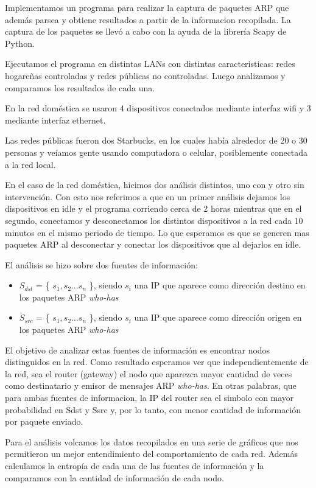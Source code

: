 Implementamos un programa para realizar la captura de paquetes ARP que además parsea y obtiene resultados a partir de la informacion recopilada. La captura de los paquetes se llevó a cabo con la ayuda de la librería Scapy de Python.

Ejecutamos el programa en distintas LANs con distintas caracteristicas: redes hogare\~nas controladas y redes públicas no controladas. Luego analizamos y comparamos los resultados de cada una.\

En la red doméstica se usaron 4 dispositivos conectados mediante interfaz wifi y 3 mediante interfaz ethernet.

Las redes públicas fueron dos Starbucks, en los cuales había alrededor de 20 o 30 personas y veíamos gente usando computadora o celular, posiblemente conectada a la red local.

En el caso de la red doméstica, hicimos dos análisis distintos, uno con y otro sin intervención. Con esto nos referimos a que en un primer análisis dejamos los dispositivos en idle y el programa corriendo cerca de 2 horas mientras
que en el segundo, conectamos y desconectamos los distintos dispositivos a la red cada 10 minutos en el mismo periodo de tiempo. Lo que esperamos es que se generen mas paquetes ARP al desconectar y conectar los dispositivos que al dejarlos en idle.

El análisis se hizo sobre dos fuentes de información:

\begin{itemize}
\item $S_{dst}$ = \{ $s_{1},s_{2} \ldots s_{n} $ \}, siendo $s_{i}$ una IP que aparece como dirección destino en los paquetes
ARP \emph{who-has}
\item $S_{src}$ = \{ $s_{1},s_{2} \ldots s_{n} $ \}, siendo $s_{i}$ una IP que aparece como dirección origen en los paquetes
ARP \emph{who-has}
\end{itemize}

El objetivo de analizar estas fuentes de información es encontrar nodos distinguidos en la red. Como resultado esperamos ver que independientemente de la red, sea el router (gateway) el nodo que aparezca mayor cantidad de veces como destinatario y 
emisor de mensajes ARP \emph{who-has}.
En otras palabras, que para ambas fuentes de informacion, la IP del router sea el simbolo con mayor probabilidad en Sdst y Ssrc y, por lo tanto, con menor cantidad de información por paquete enviado.

Para el análisis volcamos los datos recopilados en una serie de gráficos que nos permitieron un mejor entendimiento del comportamiento de cada red. Además calculamos la entropía de cada una de las fuentes de información y la comparamos con la cantidad de información de cada nodo.
